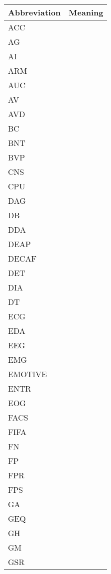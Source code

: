 \begin{tabular}{ll}
\toprule
Abbreviation & Meaning \\
\midrule
         ACC &         \\
          AG &         \\
          AI &         \\
         ARM &         \\
         AUC &         \\
          AV &         \\
         AVD &         \\
          BC &         \\
         BNT &         \\
         BVP &         \\
         CNS &         \\
         CPU &         \\
         DAG &         \\
          DB &         \\
         DDA &         \\
        DEAP &         \\
       DECAF &         \\
         DET &         \\
         DIA &         \\
          DT &         \\
         ECG &         \\
         EDA &         \\
         EEG &         \\
         EMG &         \\
     EMOTIVE &         \\
        ENTR &         \\
         EOG &         \\
        FACS &         \\
        FIFA &         \\
          FN &         \\
          FP &         \\
         FPR &         \\
         FPS &         \\
          GA &         \\
         GEQ &         \\
          GH &         \\
          GM &         \\
         GSR &         \\

\end{tabular}
